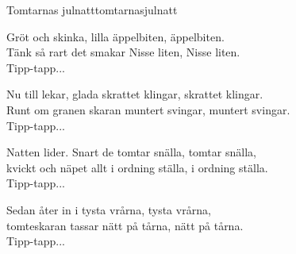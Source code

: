 \begin{song}{Tomtarnas julnatt}{tomtarnasjulnatt}
\begin{vers}
Gröt och skinka, lilla äppelbiten, äppelbiten.\\
Tänk så rart det smakar Nisse liten, Nisse liten.\\
Tipp-tapp...\\
\end{vers}
\begin{vers}
Nu till lekar, glada skrattet klingar, skrattet klingar.\\
Runt om granen skaran muntert svingar, muntert svingar.\\
Tipp-tapp...\\
\end{vers}
\begin{vers}
Natten lider. Snart de tomtar snälla, tomtar snälla,\\
kvickt och näpet allt i ordning ställa, i ordning ställa.\\
Tipp-tapp...\\
\end{vers}
\begin{vers}
Sedan åter in i tysta vrårna, tysta vrårna,\\
tomteskaran tassar nätt på tårna, nätt på tårna.\\
Tipp-tapp...\\
\end{vers}
\end{song}
